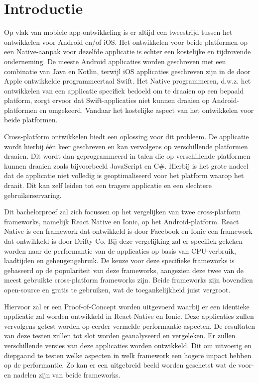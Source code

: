 
\section{Introductie}%
\label{sec:introductie}

Op vlak van mobiele app-ontwikkeling is er altijd een tweestrijd tussen het ontwikkelen voor Android en/of iOS. Het ontwikkelen voor beide platformen op een Native-aanpak voor dezelfde applicatie is echter een kostelijke en tijdrovende onderneming. De meeste Android applicaties worden geschreven met een combinatie van Java en Kotlin, terwijl iOS applicaties geschreven zijn in de door Apple ontwikkelde programmeertaal Swift. Het Native programmeren, d.w.z. het ontwikkelen van een applicatie specifiek bedoeld om te draaien op een bepaald platform, zorgt ervoor dat Swift-applicaties niet kunnen draaien op Android-platformen en omgekeerd. Vandaar het kostelijke aspect van het ontwikkelen voor beide platformen.

Cross-platform ontwikkelen biedt een oplossing voor dit probleem. De applicatie wordt hierbij één keer geschreven en kan vervolgens op verschillende platformen draaien. Dit wordt dan geprogrammeerd in talen die op verschillende platformen kunnen draaien zoals bijvoorbeeld JavaScript en C#. Hierbij is het grote nadeel dat de applicatie niet volledig is geoptimaliseerd voor het platform waarop het draait. Dit kan zelf leiden tot een tragere applicatie en een slechtere gebruikerservaring.

Dit bachelorproef zal zich focussen op het vergelijken van twee cross-platform frameworks, namelijk React Native en Ionic, op het Android-platform. React Native is een framework dat ontwikkeld is door Facebook en Ionic een framework dat ontwikkeld is door Drifty Co. Bij deze vergelijking zal er specifiek gekeken worden naar de performantie van de applicaties op basis van CPU-verbruik, laadtijden en geheugengebruik. De keuze voor deze specifieke frameworks is gebaseerd op de populariteit van deze frameworks, aangezien deze twee van de meest gebruikte cross-platform frameworks zijn.  Beide frameworks zijn bovendien open-source en gratis te gebruiken, wat de toegankelijkheid juist vergroot.

Hiervoor zal er een Proof-of-Concept worden uitgevoerd waarbij er een identieke applicatie zal worden ontwikkeld in React Native en Ionic. Deze applicaties zullen vervolgens getest worden op eerder vermelde performantie-aspecten. De resultaten van deze testen zullen tot slot worden geanalyseerd en vergeleken. Er zullen verschillende versies van deze applicaties worden ontwikkeld. Dit om uitvoerig en diepgaand te testen welke aspecten in welk framework een hogere impact hebben op de performantie. Zo kan er een uitgebreid beeld worden geschetst wat de voor- en nadelen zijn van beide frameworks.

